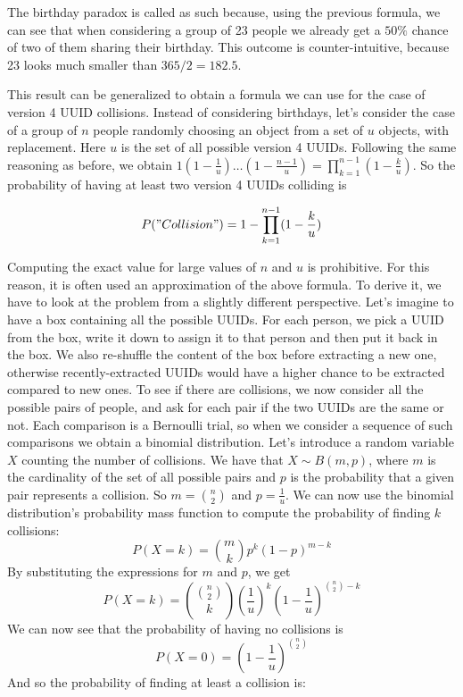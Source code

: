 \documentclass{report}
\begin{document}
The birthday paradox is called as such because, using the previous formula, we can see that when considering a group of 23 people we already get a $50\%$ chance of two of
them sharing their birthday. This outcome is counter-intuitive, because 23 looks much smaller than $365/2=182.5$. \par

This result can be generalized to obtain a formula we can use for the case of version 4 UUID collisions. Instead of considering birthdays, let's consider the case of a group of $n$
people randomly choosing an object from a set of $u$ objects, with replacement. Here $u$ is the set of all possible version 4 UUIDs. Following the same reasoning as before, we obtain
$1(1-\frac{1}{u}) \dotso (1-\frac{n-1}{u}) = \prod_{k=1}^{n-1}(1-\frac{k}{u})$. So the probability of having at least two version 4 UUIDs colliding is

\begin{equation}\label{uuid_collision_exact_formula}
P("Collision")=1- \prod_{k=1}^{n-1}(1-\frac{k}{u})
\end{equation}

Computing the exact value for large values of $n$ and $u$ is prohibitive. For this reason, it is often used an approximation of the above formula. To derive it, we have to look at the
problem from a slightly different perspective. Let's imagine to have a box containing all the possible UUIDs. For each person, we pick a UUID from the box, write it down to assign
it to that person and then put it back in the box. We also re-shuffle the content of the box before extracting a new one, otherwise recently-extracted UUIDs would have a higher
chance to be extracted compared to new ones. To see if there are collisions, we now consider all the possible pairs of people, and ask 
for each pair if the two UUIDs are the same or not. Each comparison is a Bernoulli trial, so when we consider a sequence of such comparisons we obtain a binomial distribution.
Let's introduce a random variable $X$ counting the number of collisions. We have that $X \sim B(m,p)$, where $m$ is the cardinality of the set of all possible pairs and $p$ is the
probability that a given pair represents a collision. So $m=\binom{n}{2}$ and $p=\frac{1}{u}$. We can now use the binomial distribution's probability mass function to compute the
probability of finding $k$ collisions: 
$$P(X=k)=\binom{m}{k}p^k(1-p)^{m-k}$$
By substituting the expressions for $m$ and $p$, we get
$$P(X=k)=\binom{\binom{n}{2}}{k}(\frac{1}{u})^k(1-\frac{1}{u})^{\binom{n}{2}-k}$$
We can now see that the probability of having no collisions is
$$P(X=0)=(1-\frac{1}{u})^{\binom{n}{2}}$$
And so the probability of finding at least a collision is:
\end{document}
